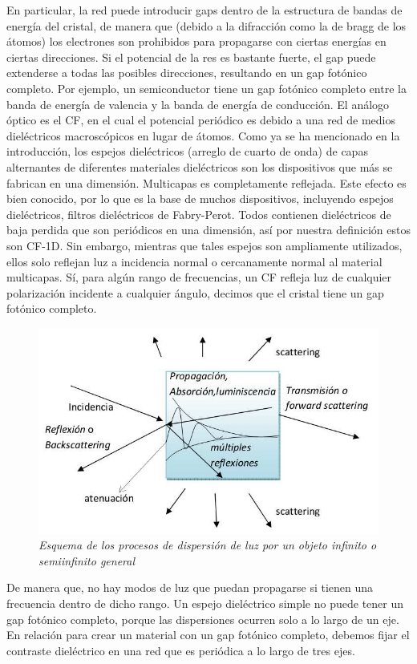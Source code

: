 \documentclass[a4paper,11pt,]{book}
\begin{document}
En particular, la red puede introducir gaps dentro de la estructura de bandas de energía del cristal, de manera que (debido a la difracción como la de bragg de los átomos) los electrones son prohibidos para propagarse con ciertas energías en ciertas direcciones. Si el potencial de la res es bastante fuerte, el gap puede extenderse a todas las posibles direcciones, resultando en un gap fotónico completo. Por ejemplo, un semiconductor tiene un gap fotónico completo entre la banda de energía de valencia y la banda de energía de conducción. El análogo óptico es el CF, en el cual el potencial periódico es debido a una red de medios dieléctricos macroscópicos en lugar de átomos.
Como ya se ha mencionado en la introducción, los espejos dieléctricos (arreglo de cuarto de onda) de capas alternantes de diferentes materiales dieléctricos son los dispositivos que más se fabrican en una dimensión. 
Multicapas es completamente reflejada. Este efecto es bien conocido, por lo que es la base de muchos dispositivos, incluyendo espejos dieléctricos, filtros dieléctricos  de Fabry-Perot. Todos contienen dieléctricos de baja perdida que son periódicos en una dimensión, así por nuestra definición estos son CF-1D. Sin embargo, mientras que tales espejos son ampliamente utilizados, ellos solo reflejan luz a incidencia normal o cercanamente normal al material multicapas. Sí, para algún rango de frecuencias, un CF refleja luz de cualquier polarización incidente a cualquier ángulo, decimos que el cristal tiene un gap fotónico completo.
\begin{figure}[H]
	\centering
	\includegraphics[scale=.3]{../Images/ep1}
	\caption{\emph{Esquema de los procesos de dispersión de luz por un objeto infinito o semiinfinito general}}
	\label{fig:CP11}
\end{figure}
De manera que, no hay modos de luz que puedan propagarse si tienen una frecuencia dentro de dicho rango. Un espejo dieléctrico simple no puede tener un gap fotónico completo, porque las dispersiones ocurren solo a lo largo de un eje. En relación para crear un material con un gap fotónico completo, debemos fijar el contraste dieléctrico en una red que es periódica a lo largo de tres ejes.
\end{document}
